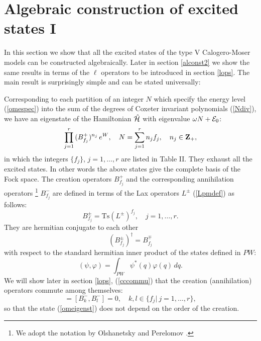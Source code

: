 \documentclass[a4paper,12pt]{article}
\begin{document}
\section{Algebraic construction of excited states I}
\label{alconst1}
\setcounter{equation}{0}
In this section we show that all the excited states of the
type V Calogero-Moser
models
can be constructed algebraically.
Later in section \ref{alconst2} we show the same results in terms of
the \(\ell\) operators to be introduced in section \ref{lops}.
The main result is surprisingly simple and can be stated universally:

Corresponding to each partition of an integer \(N\)
which specify the energy level
(\ref{omespec}) into the sum of the degrees of Coxeter
invariant polynomials
(\ref{Ndiv}), we have an eigenstate of the Hamiltonian \(\hat{\cal H}\)
with eigenvalue $\omega N+{\cal E}_0$:
\begin{equation}
   \prod_{j=1}^r\,(B_{f_j}^+)^{n_{j}}\,e^W,\quad
   N=\sum_{j=1}^rn_j f_j,\quad n_j\in{\bf Z}_+,
   \label{omeigenst}
\end{equation}
in which the integers \(\{f_j\}\), \(j=1,\ldots,r\) are listed in Table II.
They exhaust all the excited states.
In other words the above states give the complete basis of the Fock space.
The creation operators \(B_{f_j}^+\)
 and the corresponding annihilation operators
\footnote{We adopt the notation by Olshanetsky and Perelomov
\cite{OP2,Pere1}.}
 \(B_{f_j}^-\)
are defined in terms of the Lax operators \(L^\pm\)
(\ref{Lpmdef}) as follows:
\begin{equation}
   B_{f_j}^{\pm}=\mbox{Ts}(L^{\pm})^{f_j},\quad
   j=1,\ldots,r.
   \label{Bcrandef}
\end{equation}
They are hermitian conjugate to each other
\begin{equation}
   (B_{f_j}^\pm)^\dagger=B_{f_j}^\mp
\end{equation}
with respect to the standard hermitian inner product
of the states defined in \(PW\):
\begin{equation}
   (\psi,\varphi)=\int_{PW}\psi^*(q)\varphi(q)\,dq.
   \label{scalprodef}
\end{equation}
We will show later in section \ref{lops}, (\ref{cccommu}) that the
creation (annihilation) operators commute among themselves:
\begin{equation}
[B_k^+,B_l^+]=[B_k^-,B_l^-]=0,\quad k,l\in\{f_j|\ j=1,\ldots,r\},
\end{equation}
so that the state (\ref{omeigenst}) does not
depend on the order of the creation.
\end{document}
